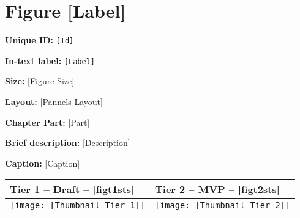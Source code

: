 \section{Figure [Label]} \label{sec_[Label]}

\small

\noindent \textbf{Unique ID:} \texttt{[Id]}

\noindent \textbf{In-text label:} \texttt{[Label]}

\noindent \textbf{Size:} [Figure Size]

\noindent \textbf{Layout:} [Pannels Layout]

\noindent \textbf{Chapter Part:} [Part]

\noindent \textbf{Brief description:} [Description]

\noindent \textbf{Caption:} [Caption]

\begin{table}[h!] %
\centering   
\small %
\sffamily %
\begin{tabular}{| m{7cm} | m{7cm} |} 
    \hline
    \textbf{Tier 1 -- Draft -- [figt1sts]} & \textbf{Tier 2 -- MVP -- [figt2sts]} \\
    \hline
    \texttt{[image: [Thumbnail Tier 1]]} & \texttt{[image: [Thumbnail Tier 2]]} \\
    \hline
    \end{tabular}
\end{table}